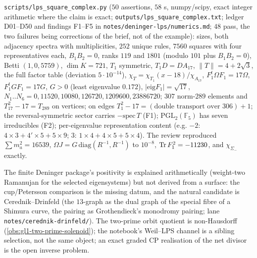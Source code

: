 \begin{numerical}
\label{num:lps-square-complex}
\texttt{scripts/lps\_square\_complex.py} ($50$ assertions, $58$ s, numpy/scipy, exact integer arithmetic where the claim is exact;
\texttt{outputs/lps\_square\_complex.txt}; ledger D01--D50 and findings F1--F5 in \texttt{notes/deninger-lps/numerics.md}; $48$ pass,
the two failures being corrections of the brief, not of the example): sizes, both adjacency spectra with multiplicities,
$252$ unique rules, $7560$ squares with four representatives each, $B_1B_2 = 0$, ranks $119$ and $1801$ (modulo $101$ plus
$B_1B_2 = 0$), Betti $(1,0,5759)$, $\dim K = 721$, $T_1$ symmetric, $T_1D = DA_{17}$, $\|T\| = 4+2\sqrt3$, the full factor table
(deviation $5\cdot10^{-14}$), $\chi_T = \chi_{T_1}(x-18)/\chi_{A_{17}}$, $F_1^{t}\Omega F_1 = 17\Omega$, $F_1^{t}GF_1 = 17G$, $G>0$ (least %
eigenvalue $0.172$), $|\mathrm{eig}F_1| = \sqrt{17}$, $N_1..N_6 = 0,11520,10080,126720,1209600,23886720$; $307$ norm-$289$ elements
and $T_{17}^2-17 = T_{289}$ on vertices; on edges $T_1^2-17 = (\text{double transport over }306) + 1$; the reversal-symmetric
sector carries $-\mathrm{spec}\,T$ (F1); $\mathrm{PGL}_2(\mathbb F_5)$ has seven irreducibles (F2); per-eigenvalue representation content
(e.g. $-2$: $4\times3+4'\times5+5\times9$; $3$: $1\times4+4\times5+5\times4$). The review reproduced $\sum m_a^2 = 16539$,
$\Omega J = G\,\mathrm{diag}(R^{-1},R^{-1})$ to $10^{-8}$, $\operatorname{Tr} F_1^2 = -11230$, and $\chi_{\Sigma_-}$ exactly. %
\end{numerical}

\begin{observation}
\label{obs:deninger-lps-next}
The finite Deninger package's positivity is explained arithmetically (weight-two Ramanujan for the selected eigensystems)
but not derived from a surface: the cup/Petersson comparison is the missing datum, and the natural candidate is
Cerednik--Drinfeld (the $13$-graph as the dual graph of the special fibre of a Shimura curve, the pairing as Grothendieck's
monodromy pairing; lane \texttt{notes/cerednik-drinfeld/}). The two-prime orbit quotient is non-Hausdorff
(\cref{obs:gl1-two-prime-solenoid}); the notebook's Weil--LPS channel is a sibling selection, not the same object; an exact
graded CP realisation of the net divisor is the open inverse problem.
\end{observation}
